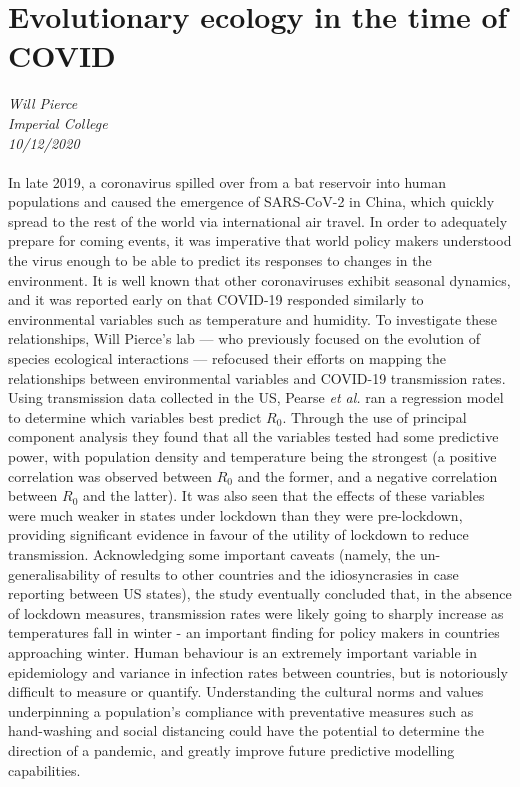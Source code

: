 \documentclass[11pt]{article}
\begin{document}
\section{Evolutionary ecology in the time of COVID}
\textit{Will Pierce\\Imperial College\\10/12/2020}
\\
\\In late 2019, a coronavirus spilled over from a bat reservoir into human populations and caused the emergence of SARS-CoV-2 in China, which quickly spread to the rest of the world via international air travel. In order to adequately prepare for coming events, it was imperative that world policy makers understood the virus enough to be able to predict its responses to changes in the environment. It is well known that other coronaviruses exhibit seasonal dynamics, and it was reported early on that COVID-19 responded similarly to environmental variables such as temperature and humidity. To investigate these relationships, Will Pierce’s lab — who previously focused on the evolution of species ecological interactions — refocused their efforts on mapping the relationships between environmental variables and COVID-19 transmission rates. Using transmission data collected in the US, Pearse  \emph{et al.} ran a regression model to determine which variables best predict $R_0$. Through the use of principal component analysis they found that all the variables tested had some predictive power, with population density and temperature being the strongest (a positive correlation was observed between $R_0$ and the former, and a negative correlation between $R_0$ and the latter). It was also seen that the effects of these variables were much weaker in states under lockdown than they were pre-lockdown, providing significant evidence in favour of the utility of lockdown to reduce transmission. Acknowledging some important caveats (namely, the un-generalisability of results to other countries and the idiosyncrasies in case reporting between US states), the study eventually concluded that, in the absence of lockdown measures, transmission rates were likely going to sharply increase as temperatures fall in winter - an important finding for policy makers in countries approaching winter. Human behaviour is an extremely important variable in epidemiology and variance in infection rates between countries, but is notoriously difficult to measure or quantify. Understanding the cultural norms and values underpinning a population's compliance with preventative measures such as hand-washing and social distancing could have the potential to determine the direction of a pandemic, and greatly improve future predictive modelling capabilities.
\end{document}
